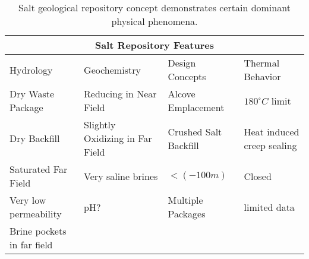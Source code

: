 %
\begin{table}[h!]
  \centering
  \footnotesize{
  \begin{tabular}{|l|l|l|l|}
    \multicolumn{4}{c}{\textbf{Salt Repository Features}}\\
    \hline
    Hydrology & Geochemistry & Design Concepts & Thermal Behavior \\ 
    \hline
    Dry Waste Package & Reducing in Near Field & Alcove Emplacement & $180^\circ C$ limit \cite{von_lensa_red-impact_2008} \\
    Dry Backfill &Slightly Oxidizing in Far Field &Crushed Salt Backfill & Heat induced creep sealing\\
    Saturated Far Field& Very saline brines  &$<(-100m)$& Closed \\
    Very low permeability & pH? & Multiple Packages &limited data\\
    Brine pockets in far field&&&\\
    \hline
  \end{tabular}
  \caption[Salt Repository Features]{Salt geological repository 
  concept demonstrates certain dominant physical phenomena. }
  \label{tab:salt_tab}
  }
\end{table}


